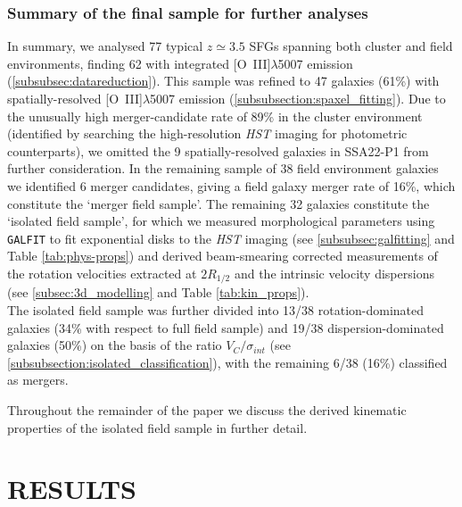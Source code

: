 \documentclass[fleqn,usenatbib]{mnras}
\begin{document}
\subsubsection{Summary of the final sample for further analyses}\label{subsubsec:kin_sample_summary}
In summary, we analysed 77 typical $z\simeq3.5$ SFGs spanning both cluster and field environments, finding 62 with integrated [O~{\sc III}]$\lambda$5007 emission (\cref{subsubsec:datareduction}).
This sample was refined to 47 galaxies (61\%) with spatially-resolved [O~{\sc III}]$\lambda$5007 emission (\cref{subsubsection:spaxel_fitting}).
Due to the unusually high merger-candidate rate of 89\% in the cluster environment (identified by searching the high-resolution {\em HST} imaging for photometric counterparts), we omitted the 9 spatially-resolved galaxies in SSA22-P1 from further consideration.
In the remaining sample of 38 field environment galaxies we identified 6 merger candidates, giving a field galaxy merger rate of 16\%, which constitute the `merger field sample'.
The remaining 32 galaxies constitute the `isolated field sample', for which we measured morphological parameters using {\tt GALFIT} to fit exponential disks to the {\em HST} imaging (see \cref{subsubsec:galfitting} and Table \ref{tab:phys-props}) and derived beam-smearing corrected measurements of the rotation velocities extracted at $2R_{1/2}$ and the intrinsic velocity dispersions (see \cref{subsec:3d_modelling} and Table \ref{tab:kin_props}). \\

The isolated field sample was further divided into 13/38 rotation-dominated galaxies (34\% with respect to full field sample) and 19/38 dispersion-dominated galaxies (50\%) on the basis of the ratio $V_{C}/\sigma_{int}$ (see \cref{subsubsection:isolated_classification}), with the remaining 6/38 (16\%) classified as mergers.

Throughout the remainder of the paper we discuss the derived kinematic properties of the isolated field sample in further detail.

\section{RESULTS}\label{sec:results}
\end{document}
